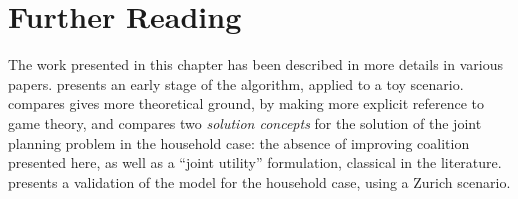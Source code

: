 {\section{Further Reading}
The work presented in this chapter has been described in more details in various papers.
presents an early stage of the algorithm, applied to a toy scenario.
compares gives more theoretical ground,
by making more explicit reference to game theory,
and compares two \emph{solution concepts} for
the solution of the joint planning problem in the household case:
the absence of improving coalition presented here,
as well as a ``joint utility'' formulation,
classical in the literature.
presents a validation of the model for the household case,
using a Zurich scenario.

} %
